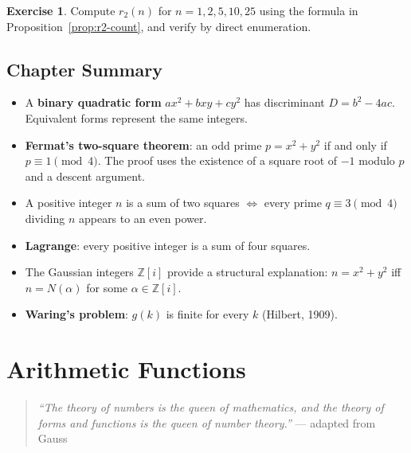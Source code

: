 \documentclass[12pt,a4paper,openany]{book}
\theoremstyle{definition}
\newtheorem{exercise}{Exercise}[chapter]
\theoremstyle{plain}
\theoremstyle{remark}
\newcommand{\Z}{\mathbb{Z}}
\begin{document}
\begin{exercise}\label{exer:r2-formula}
Compute $r_2(n)$ for $n = 1, 2, 5, 10, 25$ using the formula in
Proposition~\ref{prop:r2-count}, and verify by direct enumeration.
\end{exercise}

\section*{Chapter Summary}

\begin{itemize}
  \item A \textbf{binary quadratic form} $ax^2+bxy+cy^2$ has discriminant
        $D = b^2 - 4ac$.  Equivalent forms represent the same integers.
  \item \textbf{Fermat's two-square theorem}: an odd prime $p = x^2+y^2$ if
        and only if $p \equiv 1 \pmod{4}$.  The proof uses the existence of a
        square root of $-1$ modulo $p$ and a descent argument.
  \item A positive integer $n$ is a sum of two squares $\iff$ every prime
        $q \equiv 3\pmod{4}$ dividing $n$ appears to an even power.
  \item \textbf{Lagrange}: every positive integer is a sum of four squares.
  \item The Gaussian integers $\Z[i]$ provide a structural explanation:
        $n = x^2+y^2$ iff $n = N(\alpha)$ for some $\alpha\in\Z[i]$.
  \item \textbf{Waring's problem}: $g(k)$ is finite for every $k$ (Hilbert, 1909).
\end{itemize}

\newpage

\chapter{Arithmetic Functions}\label{ch:arith-functions}

\begin{quote}
\textit{``The theory of numbers is the queen of mathematics, and the theory
of forms and functions is the queen of number theory.''}
--- adapted from Gauss
\end{quote}
\end{document}
